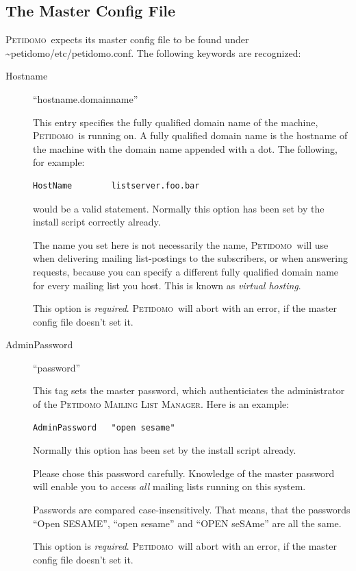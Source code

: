 \documentclass[a4paper,10pt]{scrreprt}
\newcommand{\PetidomoM}{{\scshape Peti\-domo Mail\-ing List Ma\-nager}}
\newcommand{\Petidomo}{{\scshape Peti\-domo}}
\newcommand{\Def}[1]{{\sl #1}}
\newcommand{\file}[1]{{\sf #1}}
\begin{document}
\subsection{The Master Config File}
\label{master config file}

\Petidomo\ expects its master config file to be found under
\file{\~{}peti\-do\-mo/etc/pe\-ti\-domo.conf}. The following keywords are
recognized:


\begin{description}

\item[Hostname] \hfill ``hostname.domainname''

This entry specifies the fully qualified domain name of the machine,
\Petidomo\ is running on. A fully qualified domain name is the
hostname of the machine with the domain name appended with a dot. The
following, for example:
\begin{verbatim}
HostName        listserver.foo.bar
\end{verbatim}
would be a valid statement. Normally this option has been set by the
install script correctly already.

The name you set here is not necessarily the name, \Petidomo\ will use
when delivering mailing list-postings to the subscribers, or when
answering requests, because you can specify a different fully
qualified domain name for every mailing list you host. This is known
as \Def{virtual hosting}.

This option is \emph{required}. \Petidomo\ will abort with an error,
if the master config file doesn't set it.

\item[AdminPassword] \hfill ``password''

This tag sets the master password, which authenticiates the
administrator of the \PetidomoM. Here is an example:
\begin{verbatim}
AdminPassword   "open sesame"
\end{verbatim}
Normally this option has been set by the install script already.

Please chose this password carefully. Knowledge of the master password
will enable you to access \emph{all} mailing lists running on this
system.

Passwords are compared case-insensitively. That means, that the
passwords ``Open SESAME'', ``open sesame'' and ``OPEN seSAme'' are all
the same.

This option is \emph{required}. \Petidomo\ will abort with an error,
if the master config file doesn't set it.



\end{description}
\end{document}
